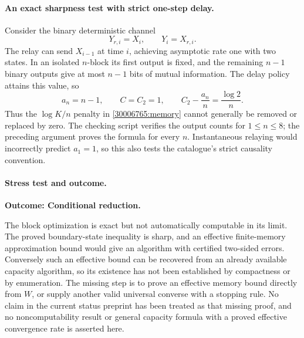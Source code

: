 \documentclass[11pt,a4paper]{article}
\numberwithin{equation}{section}
\begin{document}
\paragraph{An exact sharpness test with strict one-step delay.}
Consider the binary deterministic channel
\begin{equation}
 Y_{r,i}=X_i,\qquad Y_i=X_{r,i}.
\end{equation}
The relay can send $X_{i-1}$ at time $i$, achieving asymptotic rate one
with two states. In an isolated $n$-block its first output is fixed,
and the remaining $n-1$ binary outputs give at most $n-1$ bits of mutual
information. The delay policy attains this value, so
\begin{equation}
 a_n=n-1,\qquad C=C_2=1,
 \qquad C_2-\frac{a_n}{n}=\frac{\log2}{n}.
\end{equation}
Thus the $\log K/n$ penalty in \eqref{30006765:memory} cannot generally be
removed or replaced by zero. The checking script verifies the output
counts for $1\leq n\leq8$; the preceding argument proves the formula
for every $n$. Instantaneous relaying would incorrectly predict
$a_1=1$, so this also tests the catalogue's strict causality convention.

\paragraph{Stress test and outcome.}
\textbf{Outcome: Conditional reduction.}

The block optimization is exact but not automatically computable in
its limit. The proved boundary-state inequality is sharp, and an
effective finite-memory approximation bound would give an algorithm
with certified two-sided errors. Conversely such an effective bound
can be recovered from an already available capacity algorithm, so its
existence has not been established by compactness or by enumeration.
The missing step is to prove an effective memory bound directly from
$W$, or supply another valid universal converse with a stopping rule.
No claim in the current status preprint has been treated as that missing
proof, and no noncomputability result or general capacity formula with
a proved effective convergence rate is asserted here.
\end{document}
